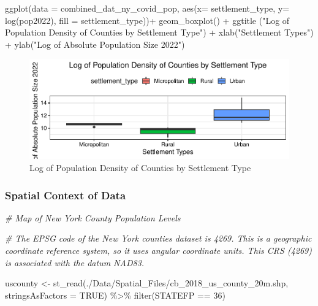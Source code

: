 \documentclass[
  12pt,
]{article}
\newenvironment{Shaded}{\begin{snugshade}}{\end{snugshade}}
\newcommand{\AttributeTok}[1]{\textcolor[rgb]{0.77,0.63,0.00}{#1}}
\newcommand{\CommentTok}[1]{\textcolor[rgb]{0.56,0.35,0.01}{\textit{#1}}}
\newcommand{\ConstantTok}[1]{\textcolor[rgb]{0.00,0.00,0.00}{#1}}
\newcommand{\DecValTok}[1]{\textcolor[rgb]{0.00,0.00,0.81}{#1}}
\newcommand{\FunctionTok}[1]{\textcolor[rgb]{0.00,0.00,0.00}{#1}}
\newcommand{\NormalTok}[1]{#1}
\newcommand{\OtherTok}[1]{\textcolor[rgb]{0.56,0.35,0.01}{#1}}
\newcommand{\SpecialCharTok}[1]{\textcolor[rgb]{0.00,0.00,0.00}{#1}}
\newcommand{\StringTok}[1]{\textcolor[rgb]{0.31,0.60,0.02}{#1}}
\begin{document}
\begin{Shaded}
\begin{Highlighting}[]
\FunctionTok{ggplot}\NormalTok{(}\AttributeTok{data =}\NormalTok{ combined\_dat\_ny\_covid\_pop, }\FunctionTok{aes}\NormalTok{(}\AttributeTok{x=}\NormalTok{ settlement\_type, }\AttributeTok{y=} \FunctionTok{log}\NormalTok{(pop2022), }\AttributeTok{fill =}\NormalTok{ settlement\_type))}\SpecialCharTok{+}
  \FunctionTok{geom\_boxplot}\NormalTok{() }\SpecialCharTok{+}
    \FunctionTok{ggtitle}\NormalTok{ (}\StringTok{"Log of Population Density of Counties by Settlement Type"}\NormalTok{) }\SpecialCharTok{+}
  \FunctionTok{xlab}\NormalTok{(}\StringTok{"Settlement Types"}\NormalTok{) }\SpecialCharTok{+}
  \FunctionTok{ylab}\NormalTok{(}\StringTok{"Log of Absolute Population Size 2022"}\NormalTok{)}
\end{Highlighting}
\end{Shaded}

\begin{figure}

\includegraphics{EDA_Final_Group_Project_files/figure-latex/unnamed-chunk-13-1} \hfill{}

\caption{Log of Population Density of Counties by Settlement Type}\label{fig:unnamed-chunk-13}
\end{figure}

\hypertarget{spatial-context-of-data}{%
\subsubsection{Spatial Context of Data}\label{spatial-context-of-data}}

\begin{Shaded}
\begin{Highlighting}[]
\CommentTok{\# Map of New York County Population Levels}
 
\CommentTok{\# The EPSG code of the New York counties dataset is 4269. This is a geographic coordinate reference system, so it uses angular coordinate units. This CRS (4269) is associated with the datum NAD83.}

\NormalTok{uscounty }\OtherTok{\textless{}{-}} \FunctionTok{st\_read}\NormalTok{(}\StringTok{\textquotesingle{}./Data/Spatial\_Files/cb\_2018\_us\_county\_20m.shp\textquotesingle{}}\NormalTok{, }\AttributeTok{stringsAsFactors =} \ConstantTok{TRUE}\NormalTok{) }\SpecialCharTok{\%\textgreater{}\%}
 \FunctionTok{filter}\NormalTok{(STATEFP }\SpecialCharTok{==} \DecValTok{36}\NormalTok{)}
\end{Highlighting}
\end{Shaded}
\end{document}
